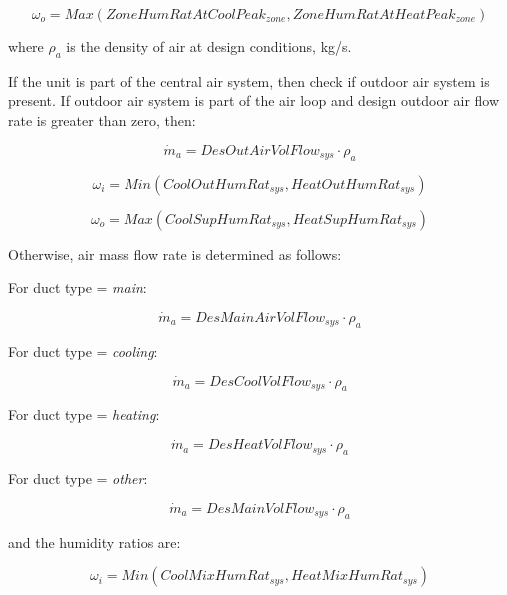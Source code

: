 \begin{equation}
  {\omega_o} = Max\left( {ZoneHumRatAtCoolPea{k_{zone}},ZoneHumRatAtHeatPea{k_{zone}}} \right)
\end{equation}

where \(\rho_{a}\) is the density of air at design conditions, kg/s.

If the unit is part of the central air system, then check if outdoor air system is present. If outdoor air system is part of the air loop and design outdoor air flow rate is greater than zero, then:

\begin{equation}
{\dot m_a} = DesOutAirVolFlo{w_{sys}} \cdot {\rho_a}
\end{equation}

\begin{equation}
{\omega_i} = Min\left( {CoolOutHumRa{t_{sys}},HeatOutHumRa{t_{sys}}} \right)
\end{equation}

\begin{equation}
  {\omega_o} = Max\left( {CoolSupHumRa{t_{sys}},HeatSupHumRa{t_{sys}}} \right)
\end{equation}

Otherwise, air mass flow rate is determined as follows:

For duct type = \emph{main}:

\begin{equation}
{\dot m_a} = DesMainAirVolFlo{w_{sys}} \cdot {\rho_a}
\end{equation}

For duct type = \emph{cooling}:

\begin{equation}
{\dot m_a} = DesCoolVolFlo{w_{sys}} \cdot {\rho_a}
\end{equation}

For duct type = \emph{heating}:

\begin{equation}
{\dot m_a} = DesHeatVolFlo{w_{sys}} \cdot {\rho_a}
\end{equation}

For duct type = \emph{other}:

\begin{equation}
{\dot m_a} = DesMainVolFlo{w_{sys}} \cdot {\rho_a}
\end{equation}

and the humidity ratios are:

\begin{equation}
{\omega_i} = Min\left( {CoolMixHumRa{t_{sys}},HeatMixHumRa{t_{sys}}} \right)
\end{equation}


